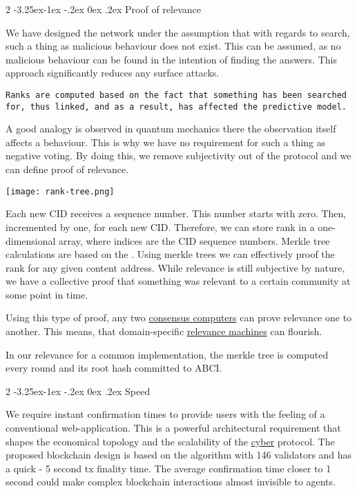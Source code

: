 \documentclass[8pt,oneside]{amsart}
\makeatletter
\newcommand{\linkred}[2]{\href{#1}{\color{red}{#2}}}
\newcommand{\linkgreen}[2]{\href{#1}{\color{green}{#2}}}
\renewcommand\subsection{\@startsection{subsection}
                                    {2}{\z@}
                                    {-3.25ex\@plus -1ex \@minus -.2ex}
                                    {0ex \@plus .2ex}
                                    {\play\Large}
                        }
\newcommand{\titleSection}[1]{\subsection{#1}}
\newenvironment{Figure}
  {\par\medskip\noindent\minipage{\linewidth}}
  {\endminipage\par\medskip}
\makeatother
\begin{document}
\titleSection{Proof of relevance}\label{proof-of-relevance}

We have designed the network under the assumption that with regards to search, such a thing as malicious behaviour does not exist. This can be assumed, as no malicious behaviour can be found in the intention of finding the answers. This approach significantly reduces any surface attacks.

\begin{lstlisting}
Ranks are computed based on the fact that something has been searched for, thus linked, and as a result, has affected the predictive model.
\end{lstlisting}

A good analogy is observed in quantum mechanics there the observation itself affects a behaviour. This is why we have no requirement for such a thing as negative voting. By doing this, we remove subjectivity out of the protocol and we can define proof of relevance.

\begin{Figure}
    \centering
    \texttt{[image: rank-tree.png]}
\end{Figure}

Each new CID receives a sequence number. This number starts with zero. Then, incremented by one, for each new CID. Therefore, we can store rank in a one-dimensional array, where indices are the CID sequence numbers. Merkle tree calculations are based on the \linkgreen{https://ipfs.io/ipfs/QmUUTW5gpJx7g5QF3PRkhjkk7jqs3r8EWcuVpZ9dHfx7DE}{RFC-6962 standard}. Using merkle trees we can effectively proof the rank for any given content address. While relevance is still subjective by nature, we have a collective proof that something was relevant to a certain community at some point in time.

Using this type of proof, any two \linkgreen{https://ipfs.io/ipfs/QmdCeixQUHBjGnKfwbB1dxf4X8xnadL8xWmmEnQah5n7x2}{IBC compatible} {\hyperref[consensus-computer]{consensus computers}} can prove relevance one to another. This means, that domain-specific {\hyperref[relevance-machine]{relevance machines}} can flourish.

In our relevance for a common \linkred{https://github.ccom/cybercongress/cyberd}{cyberd} implementation, the merkle tree is computed every round and its root hash committed to ABCI.

\titleSection{Speed}\label{speed}

We require instant confirmation times to provide users with the feeling of a conventional web-application. This is a powerful architectural requirement that shapes the economical topology and the scalability of the {\hyperref[cyber]{cyber}} protocol. The proposed blockchain design is based on the \linkgreen{https://ipfs.io/ipfs/QmaMtD7xDgghqgjN62zWZ5TBGFiEjGQtuZBjJ9sMh816KJ}{Tendermint consensus} algorithm with 146 validators and has a quick - 5 second tx finality time. The average confirmation time closer to 1 second could make complex blockchain interactions almost invisible to agents.
\end{document}
